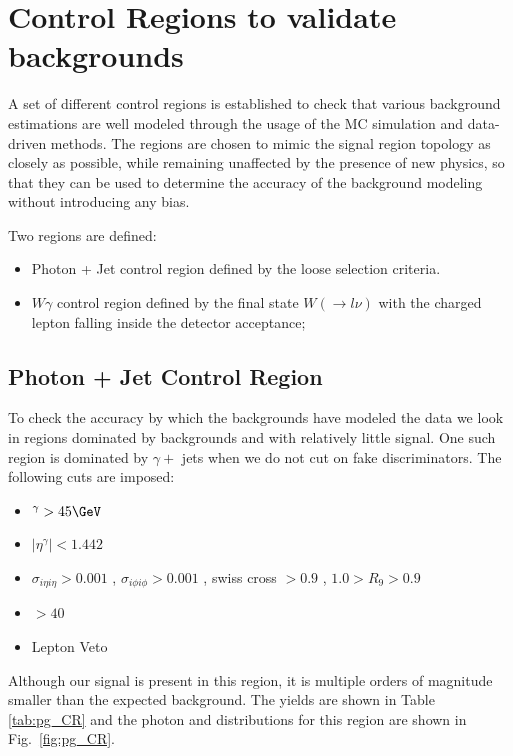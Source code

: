 \section{Control Regions to validate backgrounds}\label{sec:control}

A set of different control regions is established to check that various background estimations are well modeled through the usage of the MC simulation and
data-driven methods. The regions are chosen to mimic the signal region topology as closely as possible, while remaining unaffected by the presence of new physics, so that they can be used to determine the accuracy of the background modeling without introducing any bias.

Two regions are defined:
\begin{itemize}
\item Photon + Jet control region defined by the loose selection criteria.
\item $W\gamma$ control region defined by the final state $W(\rightarrow l \nu)$ with the  charged lepton falling inside the detector acceptance;
\end{itemize}   

\label{sec:control}
\subsection{Photon + Jet Control Region}
To check the accuracy by which the backgrounds have modeled the data we look in regions dominated by backgrounds and with relatively little signal. One such region is dominated by $\gamma +$ jets when we do not cut on fake \met discriminators. The following cuts are imposed:

\begin{itemize}
\item \et$^{\gamma} > 45 \GeV $
\item $|\eta^{\gamma}| < 1.442$
\item $\sigma_{i{\eta}i{\eta}} > 0.001$ , $\sigma_{i{\phi}i{\phi}} > 0.001$ , swiss cross $> 0.9$ , $ 1.0 > R_{9} > 0.9$
\item \met$ > 40 $
\item Lepton Veto
\end{itemize}

Although our signal is present in this region, it is multiple orders of magnitude smaller than the expected background. The yields are shown in Table \ref{tab:pg_CR} and the photon \pt and \met distributions for this region are shown in Fig.~\ref{fig:pg_CR}.


